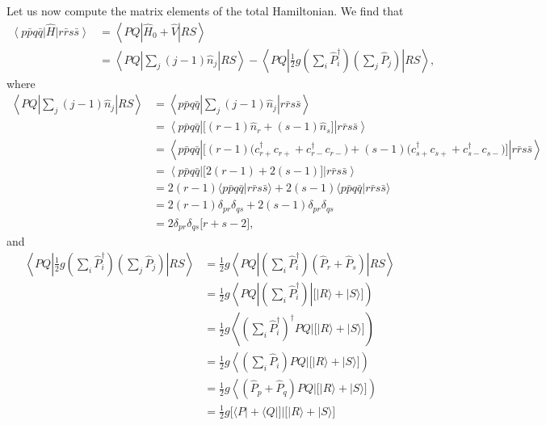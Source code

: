 \documentclass[a4paper]{article}
\newcommand{\nn}{\nonumber}
\begin{document}
Let us now compute the matrix elements of the total Hamiltonian. We find that
\begin{align}
\left\langle p\bar p q\bar q \right| \hat H \left| r \bar r s \bar s \right\rangle &= \left\langle PQ \left| \hat H_0 + \hat V  \right| RS \right\rangle \nn\\
%
&= \left\langle PQ \left| \sum_j (j-1) \hat n_j \right| RS \right\rangle -\left\langle PQ \left| \frac{1}{2}g \left(\sum_i\hat P_i^\dagger\right) \left( \sum_j \hat P_j\right)  \right| RS \right\rangle,
\end{align}
where 
\begin{align}
\left\langle PQ \left| \sum_j (j-1) \hat n_j \right| RS \right\rangle &= \left\langle p \bar p q \bar q \left| \sum_j (j-1) \hat n_j \right| r\bar r s\bar s\right\rangle \nn\\
% 
&= \left\langle p \bar p q \bar q \left| \big[ (r-1)\hat n_r + (s-1)\hat n_s \big] \right| r\bar r s\bar s\right\rangle \nn\\
%
&= \left\langle p \bar p q \bar q \left| \big[ (r-1)\big( c_{r+}^\dagger c_{r+} + c_{r-}^\dagger c_{r-} \big) + (s-1)\big( c_{s+}^\dagger c_{s+} + c_{s-}^\dagger c_{s-} \big) \big] \right| r\bar r s\bar s\right\rangle \nn\\
% 
&= \left\langle p \bar p q \bar q \left| \big[ 2(r-1) + 2(s-1) \big] \right| r\bar r s\bar s\right\rangle \nn\\
%
&= 2(r-1) \langle p \bar p q \bar q | r\bar r s\bar s\rangle + 2(s-1) \langle p \bar p q \bar q | r\bar r s\bar s\rangle \nn\\
%
&= 2(r-1) \delta_{pr}\delta_{qs} + 2(s-1) \delta_{pr}\delta_{qs} \nn\\
%
&= 2\delta_{pr}\delta_{qs} \big[r+s-2\big],
\end{align}
and 
\begin{align}
\left\langle PQ \left| \frac{1}{2}g \left(\sum_i\hat P_i^\dagger\right) \left( \sum_j \hat P_j\right)  \right| RS \right\rangle &= \frac{1}{2}g\left\langle PQ \left|  \left(\sum_i\hat P_i^\dagger\right) \left(\hat P_r + \hat P_s\right)  \right| RS \right\rangle \nn\\
%
&= \frac{1}{2}g\left\langle PQ \left|  \left(\sum_i\hat P_i^\dagger\right)\right|  \Big[\big |R\big\rangle + \big |S\big\rangle  \Big] \right) \nn\\
%
&= \frac{1}{2}g \left\langle \left(\sum_i\hat P_i^\dagger\right)^\dagger PQ \Bigg|  \Big[\big |R\big\rangle + \big |S\big\rangle  \Big] \right) \nn\\
%
&= \frac{1}{2}g \left\langle \left(\sum_i\hat P_i\right) PQ \Bigg|  \Big[\big |R\big\rangle + \big |S\big\rangle  \Big] \right) \nn\\
%
&= \frac{1}{2}g \left\langle \left(\hat P_p + \hat P_q\right) PQ \Big|  \Big[\big |R\big\rangle + \big |S\big\rangle  \Big] \right) \nn\\
%
&= \frac{1}{2}g  \Big[\big\langle P\big| + \big \langle Q\big|  \Big] \Big|  \Big[\big |R\big\rangle + \big |S\big\rangle  \Big] \nn
\end{align}
\end{document}
